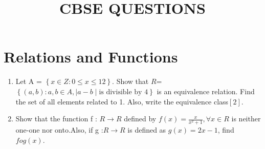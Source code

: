 \documentclass{article}
\providecommand{\sbrak}[1]{\ensuremath{{}\left[#1\right]}}
\providecommand{\brak}[1]{\ensuremath{\left(#1\right)}}
\providecommand{\cbrak}[1]{\ensuremath{\left\{#1\right\}}}
\begin{document}
\title{\textbf{CBSE QUESTIONS}}
\date{}
\maketitle{}
\section{Relations and Functions}
\begin{enumerate}
\item Let A = $\cbrak{x \in Z: 0\le x \le 12}$. Show that $R$=$\cbrak{\brak{a,b}: a,b \in A,\mid a-b \mid \text{is divisible by } 4 }$ is an equivalence relation. Find the set of all elements related to 1. Also, write the equivalence class\sbrak 2.
\item Show that the function f : \(R \longrightarrow R\) defined by $f\brak{x} = \frac{x}{x^2 + 1} , \forall x \in R $ is neither one-one nor onto.Also, if g :\(R\longrightarrow R\) is defined as $ g\brak{x} =2x - 1$, find $fog (x)$.
\end{enumerate}
\end{document}
